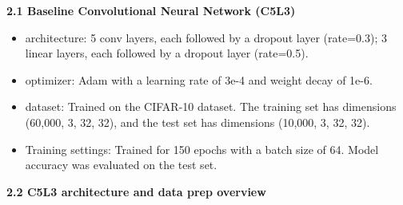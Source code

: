 \documentclass{article}
\begin{document}
\noindent \textbf{2.1 Baseline Convolutional Neural Network (C5L3) }
\begin{itemize}
  \item   architecture:  5 conv layers, each followed by a dropout layer (rate=0.3); 3 linear layers, each followed by a dropout layer (rate=0.5).
  \item   optimizer: Adam with a learning rate of 3e-4 and weight decay of 1e-6.
  \item   dataset: Trained on the CIFAR-10 dataset. The training set has dimensions (60,000, 3, 32, 32), and the test set has dimensions (10,000, 3, 32, 32).
  \item   Training settings: Trained for 150 epochs with a batch size of 64. Model accuracy was evaluated on the test set.
\end{itemize}
\vspace{5mm}
\noindent \textbf{2.2 C5L3 architecture and data prep overview}


      
\end{document}
